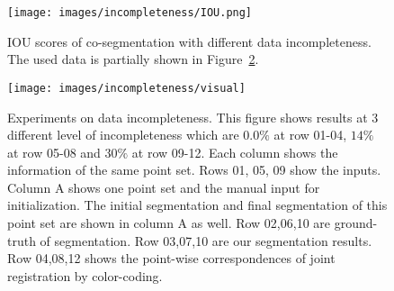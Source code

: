 \begin{figure}
	\centering
	\texttt{[image: images/incompleteness/IOU.png]}
	\caption{IOU scores of co-segmentation with different data incompleteness. The used data is partially shown in Figure~\ref{fig:incompleteness2}. }
	\label{fig:incompleteness}
\end{figure}
\begin{figure}
	\centering
	\texttt{[image: images/incompleteness/visual]}
	\caption{Experiments on data incompleteness. This figure shows results at 3 different level of incompleteness which are $0.0\%$ at row 01-04, $14\%$ at row 05-08 and $30\%$ at row 09-12. Each column shows the information of the same point set. Rows 01, 05, 09 show the inputs. 
	Column A shows one point set and the manual input for initialization. 
	The initial segmentation and final segmentation of this point set are shown in column A as well.
	Row 02,06,10 are ground-truth of segmentation. Row 03,07,10 are our segmentation results. 
	Row 04,08,12 shows the point-wise correspondences of joint registration by color-coding.}
	\label{fig:incompleteness2}
\end{figure}
